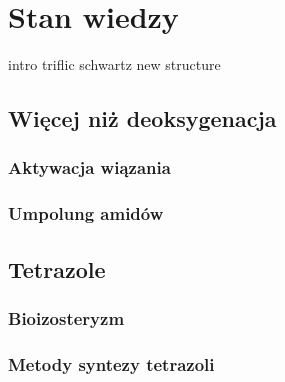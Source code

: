 \chapter{Stan wiedzy}\label{chapter:literature}

{intro}
{triflic}
{schwartz}
{new}
{structure}

\section{Więcej niż deoksygenacja}\label{literature:other}
\subsection{Aktywacja wiązania }\label{literature:other:c-n}
\subsection{Umpolung amidów}\label{literature:other:umpolung}

\section{Tetrazole}\label{literature:tetrazole}
\subsection{Bioizosteryzm}\label{literature:tetrazole:bioisosterizm}
\subsection{Metody syntezy tetrazoli}\label{literature:tetrazole:synthesis}
